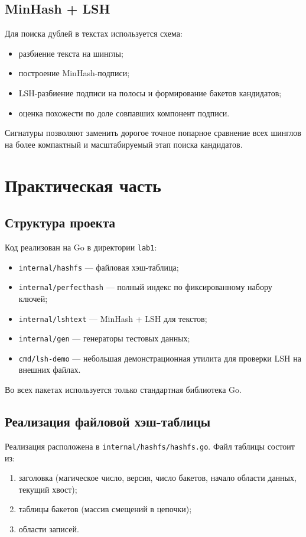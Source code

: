 \documentclass{itmo}
\begin{document}
\section{MinHash + LSH}

Для поиска дублей в текстах используется схема:
\begin{itemize}
	\item разбиение текста на шинглы;
	\item построение MinHash-подписи;
	\item LSH-разбиение подписи на полосы и формирование бакетов кандидатов;
	\item оценка похожести по доле совпавших компонент подписи.
\end{itemize}
Сигнатуры позволяют заменить дорогое точное попарное сравнение всех шинглов
на более компактный и масштабируемый этап поиска кандидатов.

\chapter{Практическая часть}

\section{Структура проекта}

Код реализован на Go в директории \texttt{lab1}:
\begin{itemize}
	\item \texttt{internal/hashfs} --- файловая хэш-таблица;
	\item \texttt{internal/perfecthash} --- полный индекс по фиксированному набору ключей;
	\item \texttt{internal/lshtext} --- MinHash + LSH для текстов;
	\item \texttt{internal/gen} --- генераторы тестовых данных;
	\item \texttt{cmd/lsh-demo} --- небольшая демонстрационная утилита для проверки LSH на внешних файлах.
\end{itemize}
Во всех пакетах используется только стандартная библиотека Go.

\section{Реализация файловой хэш-таблицы}

Реализация расположена в \texttt{internal/hashfs/hashfs.go}.
Файл таблицы состоит из:
\begin{enumerate}
	\item заголовка (магическое число, версия, число бакетов, начало области данных, текущий хвост);
	\item таблицы бакетов (массив смещений в цепочки);
	\item области записей.
\end{enumerate}
\end{document}
